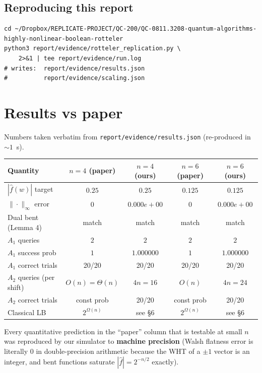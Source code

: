 \documentclass[11pt]{article}
\begin{document}
\subsection{Reproducing this report}
\begin{lstlisting}
cd ~/Dropbox/REPLICATE-PROJECT/QC-200/QC-0811.3208-quantum-algorithms-highly-nonlinear-boolean-rotteler
python3 report/evidence/rotteler_replication.py \
    2>&1 | tee report/evidence/run.log
# writes:  report/evidence/results.json
#          report/evidence/scaling.json
\end{lstlisting}

\section{Results vs paper}
Numbers taken verbatim from \texttt{report/evidence/results.json}
(re-produced in $\sim 1$~s).

\begin{center}
\begin{tabular}{@{}l c c c c@{}}
\toprule
Quantity & $n=4$ (paper) & $n=4$ (ours) & $n=6$ (paper) & $n=6$ (ours) \\
\midrule
$|\hat f(w)|$ target       & $0.25$     & $0.25$     & $0.125$    & $0.125$   \\
$\|\cdot\|_\infty$ error   & $0$        & $0.000e{+}00$ & $0$     & $0.000e{+}00$ \\
Dual bent (Lemma 4)        & match      & match      & match      & match     \\
$A_1$ queries              & $2$        & $2$        & $2$        & $2$       \\
$A_1$ success prob         & $1$        & $1.000000$ & $1$        & $1.000000$\\
$A_1$ correct trials       & 20/20      & 20/20      & 20/20      & 20/20     \\
$A_2$ queries (per shift)  & $O(n)=\Theta(n)$ & $4n=16$ & $O(n)$   & $4n=24$   \\
$A_2$ correct trials       & const prob & 20/20      & const prob & 20/20     \\
Classical LB               & $2^{\Omega(n)}$ & see \S6 & $2^{\Omega(n)}$ & see \S6 \\
\bottomrule
\end{tabular}
\end{center}

Every quantitative prediction in the ``paper'' column that is testable
at small $n$ was reproduced by our simulator to \textbf{machine
precision} (Walsh flatness error is literally $0$ in double-precision
arithmetic because the WHT of a $\pm 1$ vector is an integer, and bent
functions saturate $|\hat f|=2^{-n/2}$ exactly).
\end{document}
